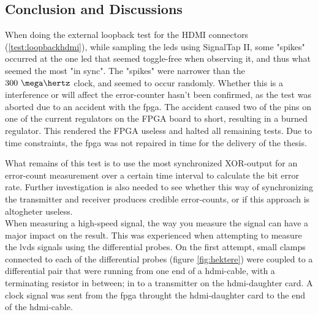 \documentclass[main.tex]{subfiles}
\begin{document}


\subsection{Conclusion and Discussions}

When doing the external loopback test for the HDMI connectors (\ref{test:loopbackhdmi}), while sampling the \glspl{led} using SignalTap II, some "spikes" occurred at the one \gls{led} that seemed toggle-free when observing it, and thus what seemed the most "in sync". The "spikes" were narrower than the $300~\mega\hertz$ clock, and seemed to occur randomly. Whether this is a interference or will affect the error-counter hasn't been confirmed, as the test was aborted due to an accident with the \gls{fpga}. The accident caused two of the pins on one of the current regulators on the FPGA board to short, resulting in a burned regulator. This rendered the FPGA useless and halted all remaining tests. Due to time constraints, the \gls{fpga} was not repaired in time for the delivery of the thesis.

What remains of this test is to use the most synchronized XOR-output for an error-count measurement over a certain time interval to calculate the bit error rate. Further investigation is also needed to see whether this way of synchronizing the transmitter and receiver produces credible error-counts, or if this approach is altogheter useless.\\



When measuring a high-speed signal, the way you measure the signal can have a major impact on the result. This was experienced when attempting to measure the \gls{lvds} signals using the differential probes. On the first attempt, small clamps connected to each of the differential probes (figure \ref{fig:hektere}) were coupled to a differential pair that were running from one end of a hdmi-cable, with a terminating resistor in between; in to a transmitter on the \gls{hdmi}-daughter card. A clock signal was sent from the \gls{fpga} throught the \gls{hdmi}-daughter card to the end of the hdmi-cable. 
\end{document}
